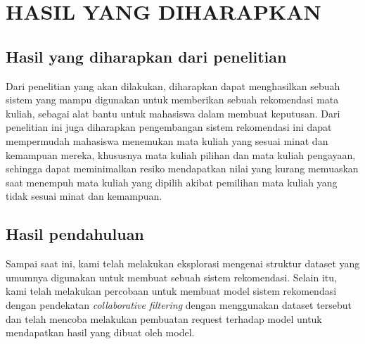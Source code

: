 \chapter{HASIL YANG DIHARAPKAN}

\section{Hasil yang diharapkan dari penelitian}
Dari penelitian yang akan dilakukan, diharapkan dapat menghasilkan sebuah sistem yang mampu digunakan untuk
memberikan sebuah rekomendasi mata kuliah, sebagai alat bantu untuk mahasiswa dalam membuat keputusan. Dari penelitian ini juga
diharapkan pengembangan sistem rekomendasi ini dapat mempermudah mahasiswa menemukan mata kuliah yang sesuai minat dan kemampuan mereka,
khususnya mata kuliah pilihan dan mata kuliah pengayaan, sehingga dapat meminimalkan resiko mendapatkan nilai yang kurang memuaskan saat
menempuh mata kuliah yang dipilih akibat pemilihan mata kuliah yang tidak sesuai minat dan kemampuan.

\section{Hasil pendahuluan}
Sampai saat ini, kami telah melakukan eksplorasi mengenai struktur dataset yang umumnya digunakan untuk membuat sebuah sistem rekomendasi.
Selain itu, kami telah melakukan percobaan untuk membuat model sistem rekomendasi dengan pendekatan \emph{collaborative filtering}
dengan menggunakan dataset tersebut dan telah mencoba melakukan pembuatan request terhadap model untuk mendapatkan hasil yang dibuat oleh model.

\newpage

